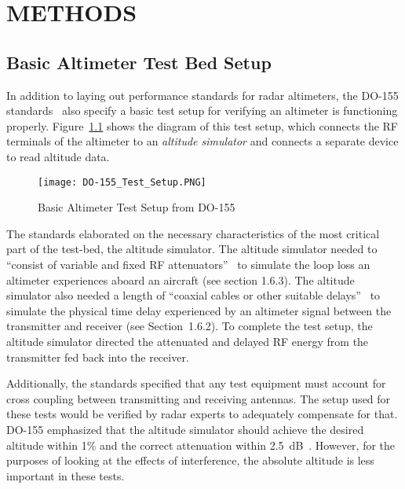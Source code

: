 %
%
%
%



\chapter{METHODS} 
\section{Basic Altimeter Test Bed Setup} \label{sec:Basic}
In addition to laying out performance standards for radar altimeters, the DO-155 standards~\cite{noauthor_minimum_1974} also specify a basic test setup for verifying an altimeter is functioning properly. Figure~\ref{fig:Basic Testbed} shows the diagram of this test setup, which connects the RF terminals of the altimeter to an \textit{altitude simulator} and connects a separate device to read altitude data.  
\begin{figure}[ht]
\centering
\texttt{[image: DO-155\_Test\_Setup.PNG]}
\caption{Basic Altimeter Test Setup from DO-155~\cite{noauthor_minimum_1974}}

\label{fig:Basic Testbed}

\end{figure}

The standards elaborated on the necessary characteristics of the most critical part of the test-bed, the altitude simulator. The altitude simulator needed to ``consist of variable and fixed RF attenuators''~\cite{noauthor_minimum_1974}  to simulate the loop loss an altimeter experiences aboard an aircraft (see section 1.6.3). The altitude simulator also needed a length of ``coaxial cables or other suitable delays''~\cite{noauthor_minimum_1974}  to simulate the physical time delay experienced by an altimeter signal between the transmitter and receiver (see Section~1.6.2). To complete the test setup, the altitude simulator directed the attenuated and delayed RF energy from the transmitter fed back into the receiver. 


Additionally, the standards specified that any test equipment must account for cross coupling between transmitting and receiving antennas. The setup used for these tests would be verified by radar experts to adequately compensate for that. DO-155 emphasized that the altitude simulator should achieve the desired altitude within 1\% and the correct attenuation within 2.5~dB~\cite{noauthor_minimum_1974}. However, for the purposes of looking at the effects of interference, the absolute altitude is less important in these tests. 

